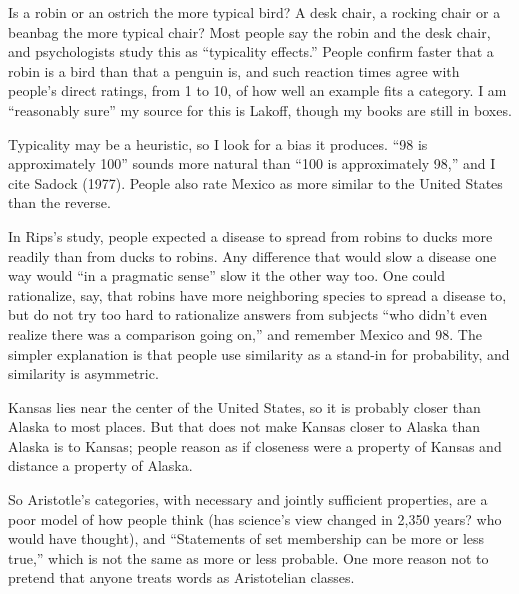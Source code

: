 
Is a robin or an ostrich the more typical bird? A desk chair, a rocking chair or a beanbag the more typical chair? Most people say the robin and the desk chair, and psychologists study this as ``typicality effects.'' People confirm faster that a robin is a bird than that a penguin is, and such reaction times agree with people's direct ratings, from 1 to 10, of how well an example fits a category. I am ``reasonably sure'' my source for this is Lakoff, though my books are still in boxes.

Typicality may be a heuristic, so I look for a bias it produces. ``98 is approximately 100'' sounds more natural than ``100 is approximately 98,'' and I cite Sadock (1977).  People also rate Mexico as more similar to the United States than the reverse. 

In Rips's study, people expected a disease to spread from robins to ducks more readily than from ducks to robins. Any difference that would slow a disease one way would ``in a pragmatic sense'' slow it the other way too.  One could rationalize, say, that robins have more neighboring species to spread a disease to, but do not try too hard to rationalize answers from subjects ``who didn't even realize there was a comparison going on,'' and remember Mexico and 98. The simpler explanation is that people use similarity as a stand-in for probability, and similarity is asymmetric. 

Kansas lies near the center of the United States, so it is probably closer than Alaska to most places. But that does not make Kansas closer to Alaska than Alaska is to Kansas; people reason as if closeness were a property of Kansas and distance a property of Alaska. 

So Aristotle's categories, with necessary and jointly sufficient properties, are a poor model of how people think (has science's view changed in 2,350 years? who would have thought), and ``Statements of set membership can be more or less true,'' which is not the same as more or less probable.  One more reason not to pretend that anyone treats words as Aristotelian classes.
